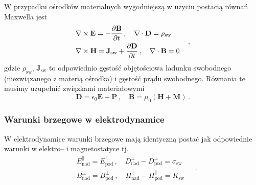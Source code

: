 \documentclass[../main.tex]{subfiles}
\begin{document}
W przypadku ośrodków materialnych wygodniejszą w użyciu postacią równań Maxwella jest
\begin{equation*}
\begin{split}
        &\nabla\times\mathbf{E}=-\pdv{\mathbf{B}}{t}\,,\quad\nabla\cdot\mathbf{D}=\rho_\text{sw}\\
    &\nabla\times\mathbf{H}=\mathbf{J}_\text{sw}+\pdv{\mathbf{D}}{t}\,,\quad\nabla\cdot\mathbf{B}=0
\end{split}\quad\,,
\end{equation*}
gdzie \(\rho_\text{sw}\), \(\mathbf{J}_\text{sw}\) to odpowiednio gęstość objętościowa ładunku
swobodnego (niezwiązanego z materią ośrodka) i gęstość prądu swobodnego. Równania te musimy
uzupełnić związkami materiałowymi
\begin{equation*}
    \mathbf{D}=\epsilon_0\mathbf{E}+\mathbf{P}\,,\quad \mathbf{B}=\mu_0(\mathbf{H}+\mathbf{M})\,.
\end{equation*}
\subsubsection{Warunki brzegowe w elektrodynamice}
W elektrodynamice warunki brzegowe mają identyczną postać jak odpowiednie warunki w elektro-- i
magnetostatyce tj.
\begin{equation*}
\begin{split}
        &E^\parallel_\text{nad}=E^\parallel_\text{pod}\,,\quad D^\perp_\text{nad}-D^\perp_\text{pod}=\sigma_\text{sw}\\
        &B^\perp_\text{nad}=B^\perp_\text{pod}\,,\quad H^\parallel_\text{nad}-H^\parallel_\text{pod}=K_\text{sw}
 \end{split}\quad\,.
\end{equation*}
\end{document}
